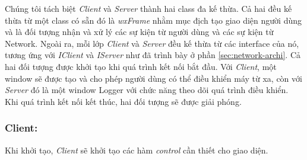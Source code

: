 Chúng tôi tách biệt \textit{Client} và \textit{Server} thành hai class đa kế thừa. Cả hai đều kế thừa từ một class có sẵn đó là \textit{wxFrame} nhằm mục địch tạo giao diện người dùng và là đối tượng nhận và xử lý các sự kiện từ người dùng và các sự kiện từ Network. Ngoài ra, mỗi lớp \textit{Client} và \textit{Server} đều kế thừa từ các interface của nó, tương ứng với \textit{IClient} và \textit{IServer} như đã trình bày ở phần \ref{sec:network-archi}. Cả hai đối tượng được khởi tạo khi quá trình kết nối bắt đầu. Với \textit{Client}, một window sẽ được tạo và cho phép người dùng có thể điều khiển máy từ xa, còn với \textit{Server} đó là một window Logger với chức năng theo dõi quá trình điều khiển. Khi quá trình kết nối kết thúc, hai đối tượng sẽ được giải phóng.

\subsubsection{Client: }
Khi khởi tạo, \textit{Client} sẽ khởi tạo các hàm \textit{control} cần thiết cho giao diện.

